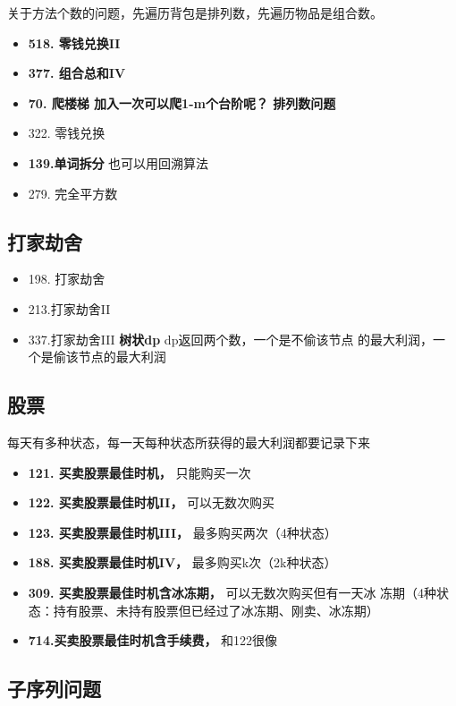 \documentclass[a4paper,twoside]{ctexart}
\begin{document}
关于方法个数的问题，先遍历背包是排列数，先遍历物品是组合数。

\begin{itemize}
\item \textbf{518. 零钱兑换II}
\item \textbf{377. 组合总和IV}
\item \textbf{70. 爬楼梯 加入一次可以爬1-m个台阶呢？ 排列数问题}
\item 322. 零钱兑换
\item \textbf{139.单词拆分} 也可以用回溯算法
\item 279. 完全平方数
\end{itemize}


\subsection{打家劫舍}

\begin{itemize}
\item 198. 打家劫舍
\item 213.打家劫舍II 
\item 337.打家劫舍III  \textbf{树状dp} dp返回两个数，一个是不偷该节点
  的最大利润，一个是偷该节点的最大利润
\end{itemize}

\subsection{股票}

每天有多种状态，每一天每种状态所获得的最大利润都要记录下来

\begin{itemize}
\item \textbf{121. 买卖股票最佳时机， }   只能购买一次
\item \textbf{122. 买卖股票最佳时机II，} 可以无数次购买
\item \textbf{123. 买卖股票最佳时机III，} 最多购买两次（4种状态）
\item \textbf{188. 买卖股票最佳时机IV，} 最多购买k次（2k种状态）
\item \textbf{309. 买卖股票最佳时机含冰冻期，} 可以无数次购买但有一天冰
  冻期（4种状态：持有股票、未持有股票但已经过了冰冻期、刚卖、冰冻期）
\item \textbf{714.买卖股票最佳时机含手续费，} 和122很像

\end{itemize}

\subsection{子序列问题}
\end{document}
